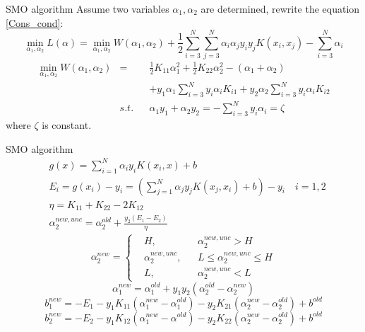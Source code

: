 \documentclass[10pt]{beamer}
\begin{document}
\begin{frame}{SMO algorithm}
Assume two variables $\alpha_1,\alpha_2$ are determined, rewrite the equation \ref{Cons_cond}:
\begin{equation}
    \underset{\alpha_1,\alpha_2}{\min}  L(\alpha)= \underset{\alpha_1,\alpha_2}{\min}W(\alpha_1,\alpha_2)
    +\frac{1}{2}\sum_{i=3}^{N}\sum_{j=3}^{N}\alpha_i\alpha_jy_iy_jK(x_i,x_j)-\sum_{i=3}^{N}\alpha_i
\end{equation}
\begin{equation}
    \begin{aligned}
    \underset{\alpha_1,\alpha_2}{\min}W(\alpha_1,\alpha_2)
   &=&&\frac{1}{2}K_{11}\alpha_1^2+\frac{1}{2}K_{22}\alpha_2^2-(\alpha_1+\alpha_2) \\
   & &&+y_1\alpha_1\sum_{i=3}^{N}y_i\alpha_iK_{i1}+y_2\alpha_2\sum_{i=3}^Ny_i\alpha_iK_{i2} \\
   &s.t.&&\alpha_1y_1+\alpha_2y_2 = -\sum_{i=3}^Ny_i\alpha_i = \zeta
    \end{aligned}
    \label{SMO_cond}
\end{equation}
where $\zeta$ is constant.
\end{frame}

\begin{frame}{SMO algorithm}
    \begin{equation}
    \begin{aligned}
    &g(x) = \sum_{i=1}^{N}\alpha_iy_iK(x_i,x)+b \\
 &E_i = g(x_i)-y_i= \left(\sum_{j=1}^N\alpha_jy_jK(x_j,x_i)+b\right)-y_i \quad i = 1,2 \\
&\eta = K_{11}+K_{22}-2K_{12} \\
&\alpha_2^{new,unc}= \alpha_2^{old}+\frac{y_2(E_1-E_2)}{\eta}
    \end{aligned}
\end{equation}
 \begin{equation}
    \alpha_2^{new}=\left\{
\begin{aligned}
&H,  &&\alpha_2^{new,unc}>H\\
&\alpha_2^{new,unc}, &&L\leq \alpha_2^{new,unc}\leq H\\
&L, &&\alpha_2^{new,unc}<L
\end{aligned}
\right.
\end{equation}
\begin{equation}
\alpha_1^{new} =    \alpha_1^{old}+y_1y_2(\alpha_2^{old}-\alpha_2^{new})
\end{equation}
\begin{equation}
b_1^{new}=-E_1-y_1K_{11}(\alpha_1^{new}-\alpha_1^{old})-y_2K_{21}(\alpha_2^{new}-\alpha_2^{old})+b^{old}
\end{equation}
\begin{equation}
b_2^{new}=-E_2-y_1K_{12}(\alpha_1^{new}-\alpha^{old})-y_2K_{22}(\alpha_2^{new}-\alpha_2^{old})+b^{old}
\end{equation}
\end{frame}
\end{document}

